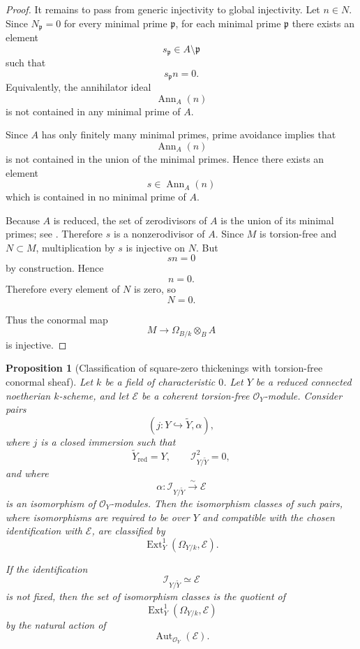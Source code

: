 \documentclass[11pt,twoside]{amsart}
\theoremstyle{plain}
\numberwithin{equation}{section}
\newtheorem{proposition}[theorem]{Proposition}
\theoremstyle{definition}
\begin{document}
\begin{proof}
It remains to pass from generic injectivity to global injectivity. Let \(n\in N\). Since
\(N_{\mathfrak p}=0\) for every minimal prime \(\mathfrak p\), for each minimal prime
\(\mathfrak p\) there exists an element
\[
    s_{\mathfrak p}\in A\setminus \mathfrak p
\]
such that
\[
    s_{\mathfrak p}n=0.
\]
Equivalently, the annihilator ideal
\[
    \operatorname{Ann}_A(n)
\]
is not contained in any minimal prime of \(A\).

Since \(A\) has only finitely many minimal primes, prime avoidance
\cite[Algebra, Lemma 10.15.2]{stacks-project} implies that
\[
    \operatorname{Ann}_A(n)
\]
is not contained in the union of the minimal primes. Hence there exists an element
\[
    s\in \operatorname{Ann}_A(n)
\]
which is contained in no minimal prime of \(A\).

Because \(A\) is reduced, the set of zerodivisors of \(A\) is the union of its minimal
primes; see \cite[Algebra, Lemma 10.25.2]{stacks-project}. Therefore \(s\) is a
nonzerodivisor of \(A\). Since \(M\) is torsion-free and \(N\subset M\), multiplication by
\(s\) is injective on \(N\). But
\[
    sn=0
\]
by construction. Hence
\[
    n=0.
\]
Therefore every element of \(N\) is zero, so
\[
    N=0.
\]

Thus the conormal map
\[
    M\longrightarrow \Omega_{B/k}\otimes_B A
\]
is injective.
\end{proof}


\begin{proposition}[Classification of square-zero thickenings with torsion-free conormal sheaf]
\label{prop:classification-square-zero-thickenings}
Let \(k\) be a field of characteristic \(0\). Let \(Y\) be a reduced connected
noetherian \(k\)-scheme, and let \(\mathcal E\) be a coherent torsion-free
\(\mathcal O_Y\)-module. Consider pairs
\[
    (j:Y\hookrightarrow \widetilde Y,\alpha),
\]
where \(j\) is a closed immersion such that
\[
    \widetilde Y_{\mathrm{red}}=Y,
    \qquad
    \mathcal I_{Y/\widetilde Y}^{2}=0,
\]
and where
\[
    \alpha:\mathcal I_{Y/\widetilde Y}\xrightarrow{\sim}\mathcal E
\]
is an isomorphism of \(\mathcal O_Y\)-modules. Then the isomorphism classes of such pairs, where isomorphisms are required to be
over \(Y\) and compatible with the chosen identification with \(\mathcal E\), are
classified by
\[
    \operatorname{Ext}^{1}_{Y}(\Omega_{Y/k},\mathcal E).
\]

If the identification
\[
    \mathcal I_{Y/\widetilde Y}\simeq\mathcal E
\]
is not fixed, then the set of isomorphism classes is the quotient of
\[
    \operatorname{Ext}^{1}_{Y}(\Omega_{Y/k},\mathcal E)
\]
by the natural action of
\[
    \operatorname{Aut}_{\mathcal O_Y}(\mathcal E).
\]
\end{proposition}
\end{document}
